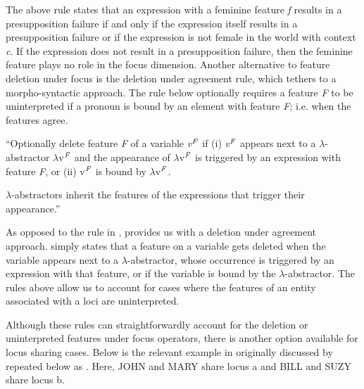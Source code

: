\documentclass[output=paper,
modfonts
]{langscibook}
\begin{document}
The above rule states that an expression with a feminine feature \textit{f} results in a presupposition failure if and only if the expression itself results in a presupposition failure or if the expression is not female in the world with context \textit{c}. If the expression does not result in a presupposition failure, then the feminine feature plays no role in the focus dimension. Another alternative to feature deletion under focus is the deletion under agreement rule, which tethers to a morpho-syntactic approach. The rule below optionally requires a feature \textit{F} to be uninterpreted if a pronoun is bound by an element with feature \textit{F}; i.e. when the features agree.

\begin{exe}
	\ex 
	\begin{xlist} 
		
		\ex \label{ex:irani:75a}``Optionally delete feature \textit{F} of a variable \textit{v$^\text{\textit{F}}$} if (i) \textit{v$^\text{\textit{F}}$} appears next to a \(\lambda\)-abstractor \(\lambda\)v$^\text{\textit{F}}$ and the appearance of \(\lambda\)v$^\text{\textit{F}}$ is triggered by an expression with feature \textit{F}, or (ii) v$^\text{\textit{F}}$ is bound by \(\lambda\)v$^\text{\textit{F}}$.
		
		\ex \(\lambda\)-abstractors inherit the features of the expressions that trigger their appearance.'' \citep[1071]{Schlenker2014}
	\end{xlist}
	
\end{exe} 

As opposed to the rule in ,  provides us with a deletion under agreement approach.  simply states that a feature on a variable gets deleted when the variable appears next to a \(\lambda\)-abstractor, whose occurrence is triggered by an expression with that feature, or if the variable is bound by the \(\lambda\)-abstractor. The rules above allow us to account for cases where the features of an entity associated with a loci are uninterpreted. 

Although these rules can straightforwardly account for the deletion or uninterpreted features under focus operators, there is another option available for locus sharing cases. Below is the relevant example in  originally discussed by \citet{Kuhn2015} repeated below as . Here, JOHN and MARY share locus a and BILL and SUZY share locus b. 
\end{document}
